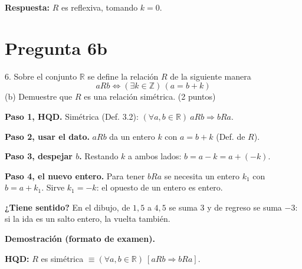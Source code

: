 \documentclass[11pt]{article}
\begin{document}
\textbf{Respuesta:} $R$ es reflexiva, tomando $k=0$.

\clearpage
\section*{Pregunta 6b}

6. Sobre el conjunto $\mathbb R$ se define la relación $R$ de la siguiente manera
\[aRb\Leftrightarrow(\exists k\in\mathbb Z)\,(a=b+k)\]
(b) Demuestre que $R$ es una relación \colorbox{green!35}{simétrica}. \hfill (2 puntos)

\begin{center}
\end{center}


\begin{explica}
\textbf{Paso 1, HQD.} Simétrica (Def. 3.2): $(\forall a,b\in\mathbb R)\ aRb\Rightarrow bRa$.

\textbf{Paso 2, usar el dato.} $aRb$ da un entero $k$ con $a=b+k$ (Def. de $R$).

\textbf{Paso 3, despejar $b$.} Restando $k$ a ambos lados: $b=a-k=a+(-k)$.

\textbf{Paso 4, el nuevo entero.} Para tener $bRa$ se necesita un entero $k_1$ con $b=a+k_1$. Sirve $k_1=-k$: el opuesto de un entero es entero.

\textbf{¿Tiene sentido?} En el dibujo, de $1{,}5$ a $4{,}5$ se suma $3$ y de regreso se suma $-3$: si la ida es un salto entero, la vuelta también.
\end{explica}

\textbf{Demostración (formato de examen).}

\textbf{HQD:} $R$ es simétrica $\equiv(\forall a,b\in\mathbb R)\ [aRb\Rightarrow bRa]$.
\end{document}
